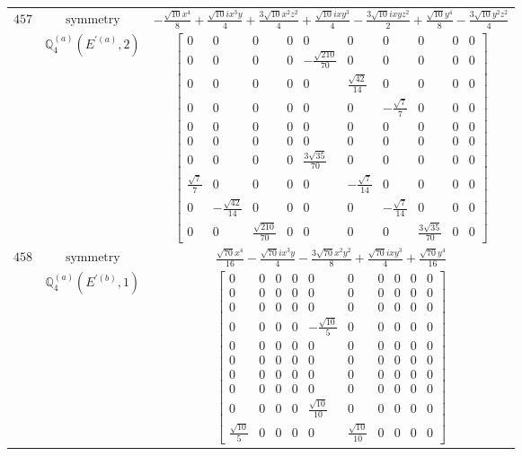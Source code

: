 \documentclass[fleqn,8pt,landscape]{jsarticle}
\begin{document}
\begin{longtable}{ccc}
$ 457 $ & $ \text{symmetry} $ & $ - \frac{\sqrt{10} x^{4}}{8} + \frac{\sqrt{10} i x^{3} y}{4} + \frac{3 \sqrt{10} x^{2} z^{2}}{4} + \frac{\sqrt{10} i x y^{3}}{4} - \frac{3 \sqrt{10} i x y z^{2}}{2} + \frac{\sqrt{10} y^{4}}{8} - \frac{3 \sqrt{10} y^{2} z^{2}}{4} $ \\
$  $ & $ \mathbb{Q}_{4}^{(a)}(E^{\prime(a)},2) $ & $ \begin{bmatrix} 0 & 0 & 0 & 0 & 0 & 0 & 0 & 0 & 0 & 0 \\ 0 & 0 & 0 & 0 & - \frac{\sqrt{210}}{70} & 0 & 0 & 0 & 0 & 0 \\ 0 & 0 & 0 & 0 & 0 & \frac{\sqrt{42}}{14} & 0 & 0 & 0 & 0 \\ 0 & 0 & 0 & 0 & 0 & 0 & - \frac{\sqrt{7}}{7} & 0 & 0 & 0 \\ 0 & 0 & 0 & 0 & 0 & 0 & 0 & 0 & 0 & 0 \\ 0 & 0 & 0 & 0 & 0 & 0 & 0 & 0 & 0 & 0 \\ 0 & 0 & 0 & 0 & \frac{3 \sqrt{35}}{70} & 0 & 0 & 0 & 0 & 0 \\ \frac{\sqrt{7}}{7} & 0 & 0 & 0 & 0 & - \frac{\sqrt{7}}{14} & 0 & 0 & 0 & 0 \\ 0 & - \frac{\sqrt{42}}{14} & 0 & 0 & 0 & 0 & - \frac{\sqrt{7}}{14} & 0 & 0 & 0 \\ 0 & 0 & \frac{\sqrt{210}}{70} & 0 & 0 & 0 & 0 & \frac{3 \sqrt{35}}{70} & 0 & 0 \end{bmatrix} $ \\ \hline
$ 458 $ & $ \text{symmetry} $ & $ \frac{\sqrt{70} x^{4}}{16} - \frac{\sqrt{70} i x^{3} y}{4} - \frac{3 \sqrt{70} x^{2} y^{2}}{8} + \frac{\sqrt{70} i x y^{3}}{4} + \frac{\sqrt{70} y^{4}}{16} $ \\
$  $ & $ \mathbb{Q}_{4}^{(a)}(E^{\prime(b)},1) $ & $ \begin{bmatrix} 0 & 0 & 0 & 0 & 0 & 0 & 0 & 0 & 0 & 0 \\ 0 & 0 & 0 & 0 & 0 & 0 & 0 & 0 & 0 & 0 \\ 0 & 0 & 0 & 0 & 0 & 0 & 0 & 0 & 0 & 0 \\ 0 & 0 & 0 & 0 & - \frac{\sqrt{10}}{5} & 0 & 0 & 0 & 0 & 0 \\ 0 & 0 & 0 & 0 & 0 & 0 & 0 & 0 & 0 & 0 \\ 0 & 0 & 0 & 0 & 0 & 0 & 0 & 0 & 0 & 0 \\ 0 & 0 & 0 & 0 & 0 & 0 & 0 & 0 & 0 & 0 \\ 0 & 0 & 0 & 0 & 0 & 0 & 0 & 0 & 0 & 0 \\ 0 & 0 & 0 & 0 & \frac{\sqrt{10}}{10} & 0 & 0 & 0 & 0 & 0 \\ \frac{\sqrt{10}}{5} & 0 & 0 & 0 & 0 & \frac{\sqrt{10}}{10} & 0 & 0 & 0 & 0 \end{bmatrix} $ \\ \hline

\end{longtable}
\end{document}
